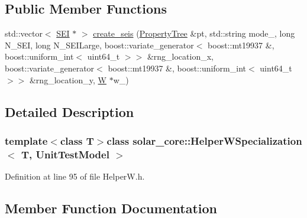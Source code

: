 \subsection*{Public Member Functions}
\begin{DoxyCompactItemize}
\item 
std\+::vector$<$ \hyperlink{classsolar__core_1_1_s_e_i}{S\+E\+I} $\ast$ $>$ \hyperlink{classsolar__core_1_1_helper_w_specialization_3_01_t_00_01_unit_test_model_01_4_adf23c2c9808e7d9ef18a4d778bacccce}{create\+\_\+seis} (\hyperlink{namespacesolar__core_adeda2737d6938c190eb774a5b2495045}{Property\+Tree} \&pt, std\+::string mode\+\_\+, long N\+\_\+\+S\+E\+I, long N\+\_\+\+S\+E\+I\+Large, boost\+::variate\+\_\+generator$<$ boost\+::mt19937 \&, boost\+::uniform\+\_\+int$<$ uint64\+\_\+t $>$$>$ \&rng\+\_\+location\+\_\+x, boost\+::variate\+\_\+generator$<$ boost\+::mt19937 \&, boost\+::uniform\+\_\+int$<$ uint64\+\_\+t $>$$>$ \&rng\+\_\+location\+\_\+y, \hyperlink{classsolar__core_1_1_w}{W} $\ast$w\+\_\+)
\end{DoxyCompactItemize}


\subsection{Detailed Description}
\subsubsection*{template$<$class T$>$class solar\+\_\+core\+::\+Helper\+W\+Specialization$<$ T, Unit\+Test\+Model $>$}



Definition at line 95 of file Helper\+W.\+h.



\subsection{Member Function Documentation}
\hypertarget{classsolar__core_1_1_helper_w_specialization_3_01_t_00_01_unit_test_model_01_4_adf23c2c9808e7d9ef18a4d778bacccce}{}
